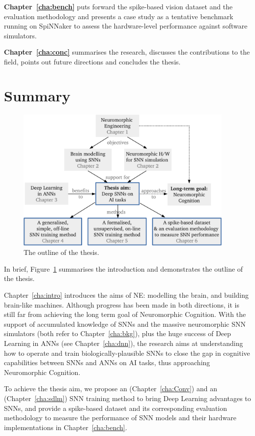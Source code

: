 \textbf{Chapter~\ref{cha:bench}} puts forward the spike-based vision dataset and the evaluation methodology and presents a case study as a tentative benchmark running on SpiNNaker to assess the hardware-level performance against software simulators.

\textbf{Chapter~\ref{cha:conc}} summarises the research, discusses the contributions to the field, points out future directions and concludes the thesis.

\section{Summary}
	\begin{figure}[tbh!]
		\centering
		\includegraphics[width=0.95\textwidth]{pics_intro/intro_new.pdf}
		\caption{
			The outline of the thesis.
		}
		\label{fig:intro}
	\end{figure}

	In brief, Figure~\ref{fig:intro} summarises the introduction and demonstrates the outline of the thesis.

	Chapter~\ref{cha:intro} introduces the aims of NE: modelling the brain, and building brain-like machines.
	Although progress has been made in both directions, it is still far from achieving the long term goal of Neuromorphic Cognition.
	With the support of accumulated knowledge of SNNs and the massive neuromorphic SNN simulators (both refer to Chapter~\ref{cha:bkg}), plus the huge success of Deep Learning in ANNs (see Chapter~\ref{cha:dnn}), the research aims at understanding how to operate and train biologically-plausible SNNs to close the gap in cognitive capabilities between SNNs and ANNs on AI tasks, thus approaching Neuromorphic Cognition.

	To achieve the thesis aim, we propose an \DIFdelbegin {}\DIFdelend \DIFaddbegin {}\DIFaddend (Chapter~\ref{cha:Conv}) and an \DIFdelbegin {}\DIFdelend \DIFaddbegin {}\DIFaddend (Chapter~\ref{cha:sdlm}) SNN training method to bring Deep Learning advantages to SNNs, and provide a spike-based dataset and its corresponding evaluation methodology to measure the performance of SNN models and their hardware implementations in Chapter~\ref{cha:bench}.
